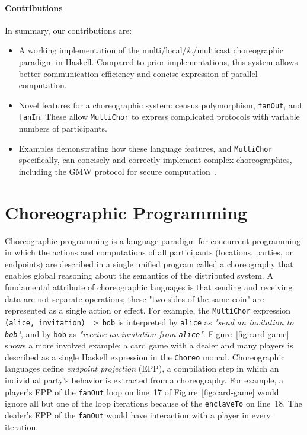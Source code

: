 \documentclass[sigplan,screen]{acmart}
\newcommand{\inlinecode}[2][haskell]{\texttt{#2}}
\newcommand{\MultiChor}{\texttt{Multi\-Chor}\xspace}
\begin{document}
\paragraph{Contributions}\label{sec:contributions}
In summary, our contributions are:
\begin{itemize}[leftmargin=12pt]
    \item A working implementation of the multi\-/local\-/\&\-/multicast choreographic paradigm
    in Haskell.
    Compared to prior implementations, this system allows better communication efficiency
    and concise expression of parallel computation.
    \item Novel features for a choreographic system:
    census polymorphism, \inlinecode{fanOut}, and \inlinecode{fanIn}.
    These allow \MultiChor to express complicated protocols with variable numbers of participants.
    \item Examples demonstrating how these language features, and \MultiChor specifically,
    can concisely and correctly implement complex choreographies,
    including the GMW protocol for secure computation~\cite{goldreich2019play}.
\end{itemize}

\section{Choreographic Programming}\label{sec:background}


Choreographic programming is a language paradigm for concurrent programming in which
the actions and computations of all participants (locations, parties, or endpoints)
are described in a single unified program called a choreography that enables global reasoning about the semantics of the distributed system.
A fundamental attribute of choreographic languages is that
sending and receiving data are not separate operations;
these "two sides of the same coin" are represented as a single action or effect.
For example, the \MultiChor expression
\inlinecode{(alice, invitation) ~> bob}
is interpreted by \inlinecode{alice} as \textit{"send an invitation to \inlinecode{bob}"},
and by \inlinecode{bob} as \textit{"receive an invitation from \inlinecode{alice}"}.
Figure~\ref{fig:card-game} shows a more involved example;
a card game with a dealer and many players is described as a single Haskell expression
in the \inlinecode{Choreo} monad.
Choreographic languages define \emph{endpoint projection} (EPP),
a compilation step in which an individual party's behavior is extracted from a choreography.
For example, a player's EPP of the \inlinecode{fanOut} loop on
line~17 of Figure~\ref{fig:card-game}
would ignore all but one of the loop iterations
because of the \inlinecode{enclaveTo} on line~18.
The dealer's EPP of the \inlinecode{fanOut} would have interaction with a player
in every iteration.
\end{document}
